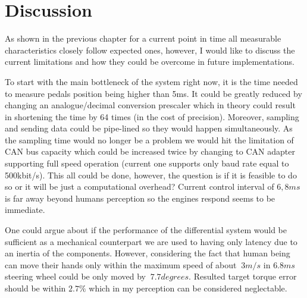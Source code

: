 



\chapter{Discussion}
As shown in the previous chapter for a current point in time all measurable characteristics closely follow expected ones, however, I would like to discuss the current limitations and how they could be overcome in future implementations.

To start with the main bottleneck of the system right now, it is the time needed to measure pedals position being higher than 5ms. It could be greatly reduced by changing an analogue/decimal conversion prescaler which in theory could result in shortening the time by 64 times (in the cost of precision). Moreover, sampling and sending data could be pipe-lined so they would happen simultaneously. As the sampling time would no longer be a problem we would hit the limitation of CAN bus capacity which could be increased twice by changing to CAN adapter supporting full speed operation (current one supports only baud rate equal to 500kbit/s). This all could be done, however, the question is if it is feasible to do so or it will be just a computational overhead? Current control interval of $6,8ms$ is far away beyond humans perception so the engines respond seems to be immediate. 

One could argue about if the performance of the differential system would be sufficient as a mechanical counterpart we are used to having only latency due to an inertia of the components. However, considering the fact that human being can move their hands only within the maximum speed of about $~3m/s$ \cite{human_reaction_time} in $6.8ms$ steering wheel could be only moved by $~7.7 degrees$. Resulted target torque error should be within $2.7\%$ which in my perception can be considered neglectable.

